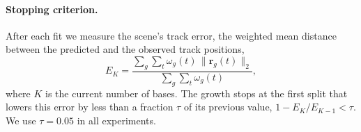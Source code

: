 \paragraph{Stopping criterion.}
\label{sec:tau}
After each fit we measure the scene's track error, the weighted mean distance between the predicted and the observed track positions,
\begin{equation}
  E_K = \frac{\sum_g \sum_t \omega_g(t)\, \lVert \mathbf{r}_g(t) \rVert_2}{\sum_g \sum_t \omega_g(t)} ,
  \label{eq:scene-error}
\end{equation}
where $K$ is the current number of bases.
The growth stops at the first split that lowers this error by less than a fraction $\tau$ of its previous value, $1 - E_K / E_{K-1} < \tau$.
We use $\tau = 0.05$ in all experiments. 








